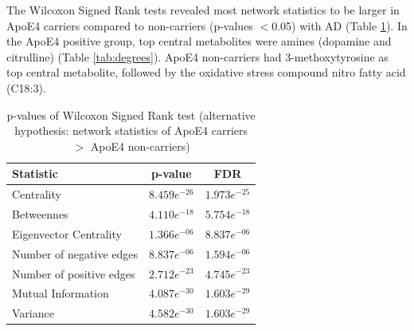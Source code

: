 \documentclass{amsart}
\begin{document}
The Wilcoxon Signed Rank tests revealed most network statistics to be larger in ApoE4 carriers compared to non-carriers (p-values $<$0.05) with AD (Table \ref{tab:netstats}). In the ApoE4 positive group, top central metabolites were amines (dopamine and citrulline) (Table \ref{tab:degrees}). ApoE4 non-carriers had 3-methoxytyrosine as top central metabolite, followed by the oxidative stress compound nitro fatty acid (C18:3).
\begin{table}[H]
  \caption{\label{tab:netstats} p-values of Wilcoxon Signed Rank test (alternative hypothesis: network statistics of ApoE4 carriers $>$ ApoE4 non-carriers)}
  \begin{tabular}{lcc}
  \toprule
  Statistic & p-value & FDR \\ \midrule
  Centrality                   & $8.459e^{-26}$ & $1.973e^{-25}$    \\
  Betweennes                   & $4.110e^{-18}$ & $5.754e^{-18}$    \\
  Eigenvector Centrality       & $1.366e^{-06}$ & $8.837e^{-06}$    \\
  Number of negative edges     & $8.837e^{-06}$ & $1.594e^{-06}$    \\
  Number of positive edges     & $2.712e^{-23}$ & $4.745e^{-23}$    \\
  Mutual Information           & $4.087e^{-30}$ & $1.603e^{-29}$    \\
  Variance                     & $4.582e^{-30}$ & $1.603e^{-29}$    \\ \bottomrule
  \end{tabular}
  \end{table}
\clearpage
\end{document}

